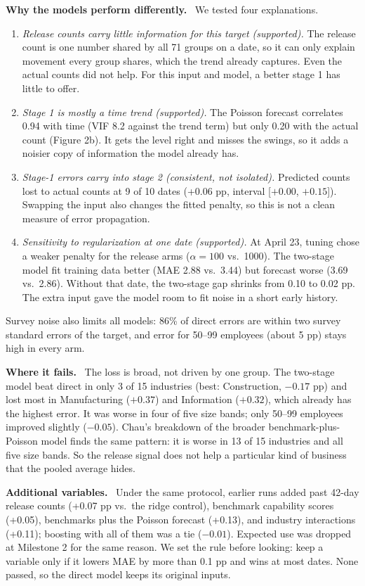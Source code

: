 \documentclass[10pt]{article}
\newcommand{\sub}[1]{\textbf{#1}\ }
\begin{document}
\sub{Why the models perform differently.} We tested four explanations.
\begin{enumerate}
\item \emph{Release counts carry little information for this target (supported).} The release count is one number shared by all 71 groups on a date, so it can only explain movement every group shares, which the trend already captures. Even the actual counts did not help. For this input and model, a better stage 1 has little to offer.
\item \emph{Stage 1 is mostly a time trend (supported).} The Poisson forecast correlates 0.94 with time (VIF 8.2 against the trend term) but only 0.20 with the actual count (Figure 2b). It gets the level right and misses the swings, so it adds a noisier copy of information the model already has.
\item \emph{Stage-1 errors carry into stage 2 (consistent, not isolated).} Predicted counts lost to actual counts at 9 of 10 dates (+0.06 pp, interval [$+0.00$, $+0.15$]). Swapping the input also changes the fitted penalty, so this is not a clean measure of error propagation.
\item \emph{Sensitivity to regularization at one date (supported).} At April 23, tuning chose a weaker penalty for the release arms ($\alpha=100$ vs.\ 1000). The two-stage model fit training data better (MAE 2.88 vs.\ 3.44) but forecast worse (3.69 vs.\ 2.86). Without that date, the two-stage gap shrinks from 0.10 to 0.02 pp. The extra input gave the model room to fit noise in a short early history.
\end{enumerate}
Survey noise also limits all models: 86\% of direct errors are within two survey standard errors of the target, and error for 50--99 employees (about 5 pp) stays high in every arm.

\sub{Where it fails.} The loss is broad, not driven by one group. The two-stage model beat direct in only 3 of 15 industries (best: Construction, $-0.17$ pp) and lost most in Manufacturing ($+0.37$) and Information ($+0.32$), which already has the highest error. It was worse in four of five size bands; only 50--99 employees improved slightly ($-0.05$). Chau's breakdown of the broader benchmark-plus-Poisson model finds the same pattern: it is worse in 13 of 15 industries and all five size bands. So the release signal does not help a particular kind of business that the pooled average hides.

\sub{Additional variables.} Under the same protocol, earlier runs added past 42-day release counts (+0.07 pp vs.\ the ridge control), benchmark capability scores (+0.05), benchmarks plus the Poisson forecast (+0.13), and industry interactions (+0.11); boosting with all of them was a tie ($-0.01$). Expected use was dropped at Milestone 2 for the same reason. We set the rule before looking: keep a variable only if it lowers MAE by more than 0.1 pp and wins at most dates. None passed, so the direct model keeps its original inputs.
\end{document}
